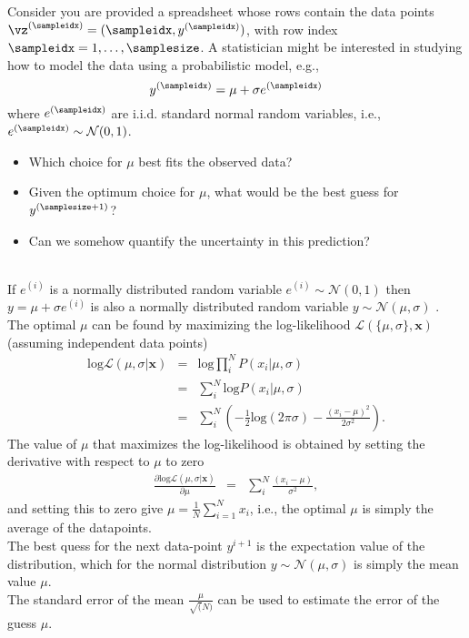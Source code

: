 \documentclass[article,11pt]{article}
\begin{document}
Consider you are provided a spreadsheet whose rows contain the data points $\vz^{(\sampleidx)}=(\sampleidx,y^{(\sampleidx)})$, with row index $\sampleidx=1,\ldots,\samplesize$.  
A statistician might be interested in studying how to model the data using a probabilistic model, e.g., 
\begin{equation} 
y^{(\sampleidx)} = \mu + \sigma e^{(\sampleidx)} 
\end{equation}
where $e^{(\sampleidx)}$ are i.i.d. standard normal random variables, i.e., $e^{(\sampleidx)} \sim \mathcal{N}(0,1)$.
\begin{itemize}
\item Which choice for $\mu$ best fits the observed data?
\item Given the optimum choice for $\mu$, what would be the best guess for $y^{(\samplesize+1)}$?
\item Can we somehow quantify the uncertainty in this prediction?
\end{itemize}
\\If $e^{(i)}$ is a normally distributed random variable $e^{(i)} \sim \mathcal{N}(0,1)$ then $y = \mu + \sigma e^{(i)}$ is also a normally distributed random variable $y \sim \mathcal{N}(\mu,\sigma)$ .\\
 The optimal $\mu$ can be found by maximizing the log-likelihood $\mathcal{L}(\{\mu, \sigma\}, \mathbf{x})$ (assuming independent data points)
\begin{eqnarray}
  \mathrm{log}\mathcal{L}(\mu, \sigma | \mathbf{x})&=& \mathrm{log}\prod_i^NP(x_i|\mu,\sigma)\nonumber\\
  &=& \sum_i^N\mathrm{log}P(x_i|\mu,\sigma)\\
  &=& \sum_i^N\left(-\frac{1}{2}\mathrm{log}(2\pi\sigma)-\frac{(x_i - \mu)^2}{2\sigma^2}\right).
\label{eq:max-likelihood1}
\end{eqnarray}
The value of $\mu$ that maximizes the log-likelihood is obtained by setting the derivative with respect to $\mu$ to zero
\begin{eqnarray}
  \frac{\partial\mathrm{log}\mathcal{L}(\mu, \sigma | \mathbf{x})}{\partial\mu}&=&  \sum_i^N\frac{(x_i - \mu)}{\sigma^2},
\label{eq:max-likelihood2}
\end{eqnarray}
and setting this to zero give $\mu= \frac{1}{N}\sum_{i=1}^Nx_i$, i.e., the optimal $\mu$ is simply the average of the datapoints.\\
 The best quess for the next data-point $y^{i+1}$ is the expectation value of the distribution, which for the normal distribution $y \sim \mathcal{N}(\mu,\sigma)$ is simply the mean value $\mu$.\\
 The standard error of the mean $\frac{\mu}{\sqrt(N)}$ can be used to estimate the error of the guess $\mu$.
\end{document}
